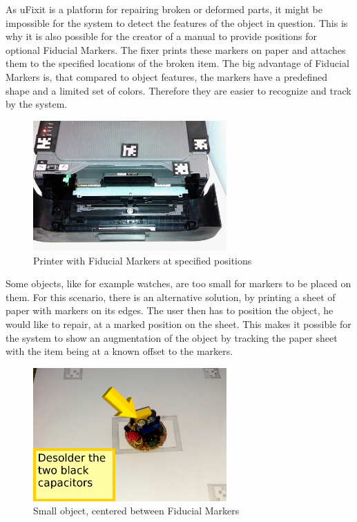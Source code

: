 As uFixit is a platform for repairing broken or deformed parts, it might be impossible for the system to detect the features of the object in question. This is why it is also possible for the creator of a manual to provide positions for optional Fiducial Markers. The fixer prints these markers on paper and attaches them to the specified locations of the broken item. The big advantage of Fiducial Markers is, that compared to object features, the markers have a predefined shape and a limited set of colors. Therefore they are easier to recognize and track by the system.
\begin{figure}[H]
		\includegraphics[width=0.66\textwidth]{../images/markerOnObject.jpg}
		\centering
		\caption{Printer with Fiducial Markers at specified positions}
		\label{fig:cardBoard}
\end{figure}

Some objects, like for example watches, are too small for markers to be placed on them. For this scenario, there is an alternative solution, by printing a sheet of paper with markers on its edges. The user then has to position the object, he would like to repair, at a marked position on the sheet. This makes it possible for the system to show an augmentation of the object by tracking the paper sheet with the item being at a known offset to the markers.

\begin{figure}[H]
		\includegraphics[width=0.66\textwidth]{../images/markerOnPaper.png}
		\centering
		\caption{Small object, centered between Fiducial Markers}
		\label{fig:cardBoard}
\end{figure}

